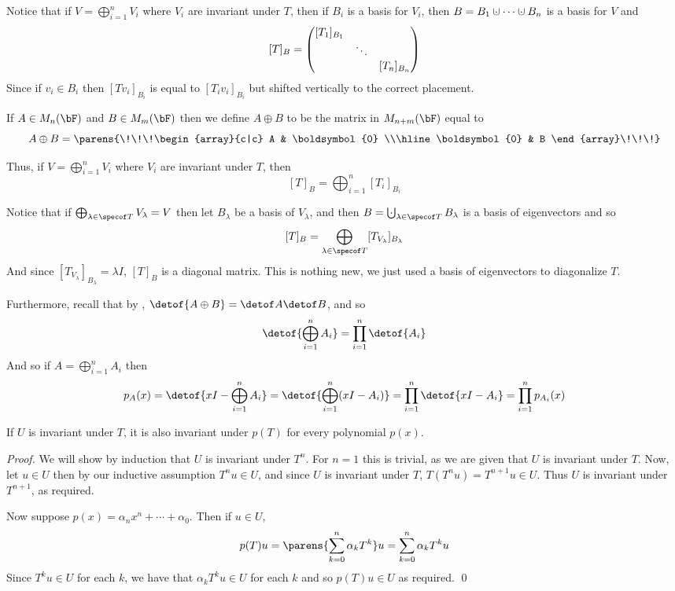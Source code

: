 Notice that if $V=\bigoplus_{i=1}^n V_i$ where $V_i$ are invariant under $T$, then if $B_i$ is a basis for $V_i$, then $B=B_1\dcup\cdots\dcup B_n$ is a basis for $V$ and
\[ [T]_B = \begin{pmatrix}[T_1]_{B_1} \\ & \ddots \\ & & [T_n]_{B_n}\end{pmatrix} \]
Since if $v_i\in B_i$ then $[Tv_i]_{B_i}$ is equal to $[T_iv_i]_{B_i}$ but shifted vertically to the correct placement.

\begin{defn*}

    If $A\in M_n(\bF)$ and $B\in M_m(\bF)$ then we define $A\oplus B$ to be the matrix in $M_{n+m}(\bF)$ equal to
    \[ A\oplus B = \parens{\!\!\!\begin{array}{c|c} A & \boldsymbol{0} \\\hline \boldsymbol{0} & B \end{array}\!\!\!} \]

\end{defn*}

Thus, if $V=\bigoplus_{i=1}^n V_i$ where $V_i$ are invariant under $T$, then
\[ [T]_B = \bigoplus_{i=1}^n [T_i]_{B_i} \]

Notice that if $\bigoplus_{\lambda\in\specof T}V_\lambda=V$ then let $B_\lambda$ be a basis of $V_\lambda$, and then $B=\bigdcup_{\lambda\in\specof T}B_\lambda$ is a basis of eigenvectors and so
\[ [T]_B = \bigoplus_{\lambda\in\specof T}[T_{V_\lambda}]_{B_\lambda} \]
And since $[T_{V_\lambda}]_{B_\lambda}=\lambda I$, $[T]_B$ is a diagonal matrix.
This is nothing new, we just used a basis of eigenvectors to diagonalize $T$.

Furthermore, recall that by , $\detof{A\oplus B}=\detof A\detof B$, and so
\[ \detof{\bigoplus_{i=1}^n A_i} = \prod_{i=1}^n\detof{A_i} \]
And so if $A=\bigoplus_{i=1}^n A_i$ then
\[ p_A(x) = \detof{xI-\bigoplus_{i=1}^n A_i} = \detof{\bigoplus_{i=1}^n (xI-A_i)} = \prod_{i=1}^n\detof{xI-A_i} = \prod_{i=1}^n p_{A_i}(x) \]

\begin{prop*}[invarUnderPoly]

    If $U$ is invariant under $T$, it is also invariant under $p(T)$ for every polynomial $p(x)$.

\end{prop*}

\begin{proof}

    We will show by induction that $U$ is invariant under $T^n$.
    For $n=1$ this is trivial, as we are given that $U$ is invariant under $T$.
    Now, let $u\in U$ then by our inductive assumption $T^nu\in U$, and since $U$ is invariant under $T$, $T(T^nu)=T^{n+1}u\in U$.
    Thus $U$ is invariant under $T^{n+1}$, as required.

    Now suppose $p(x)=\alpha_nx^n+\cdots+\alpha_0$.
    Then if $u\in U$,
    \[ p(T)u = \parens{\sum_{k=0}^n\alpha_kT^k}u = \sum_{k=0}^n\alpha_kT^ku \]
    Since $T^ku\in U$ for each $k$, we have that $\alpha_kT^ku\in U$ for each $k$ and so $p(T)u\in U$ as required.
    \qed

\end{proof}

